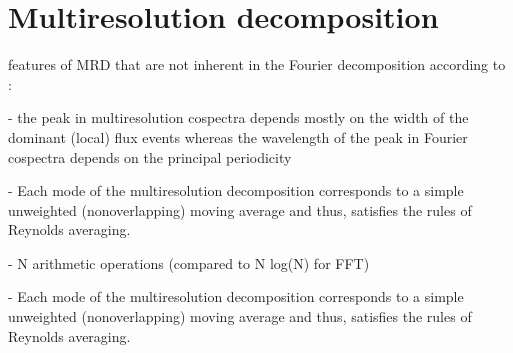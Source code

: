 \documentclass[11pt]{article}
\begin{document}
	
 

	
	
	\section{Multiresolution decomposition}
	features of MRD that are not inherent in the Fourier decomposition according to \citet{Howell1997}:
	\begin{compactenum}
		\item[-] the peak in multiresolution cospectra depends
		mostly on the width of the dominant (local) flux events whereas the wavelength
		of the peak in Fourier cospectra depends on the principal periodicity
		\item[-] Each mode of the multiresolution decomposition corresponds to a simple unweighted (nonoverlapping) moving average and thus, satisfies the rules of
		Reynolds averaging.
		\item[-] N arithmetic operations (compared to N log(N) for FFT)
		\item[-] Each mode of the multiresolution decomposition corresponds to a simple unweighted (nonoverlapping) moving average and thus, satisfies the rules of
		Reynolds averaging.
	\end{compactenum}
	
	
	
\end{document}
